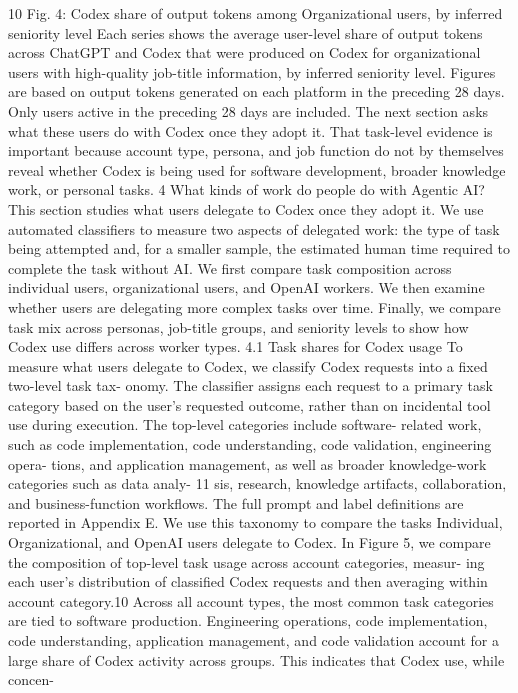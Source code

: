 10
Fig. 4: Codex share of output tokens among Organizational users, by inferred seniority level
Each series shows the average user-level share of output tokens across ChatGPT and Codex that were produced on Codex
for organizational users with high-quality job-title information, by inferred seniority level. Figures are based on output tokens
generated on each platform in the preceding 28 days. Only users active in the preceding 28 days are included.
The next section asks what these users do with Codex once they adopt it. That task-level evidence is
important because account type, persona, and job function do not by themselves reveal whether Codex
is being used for software development, broader knowledge work, or personal tasks.
4
What kinds of work do people do with Agentic AI?
This section studies what users delegate to Codex once they adopt it. We use automated classifiers to
measure two aspects of delegated work: the type of task being attempted and, for a smaller sample,
the estimated human time required to complete the task without AI. We first compare task composition
across individual users, organizational users, and OpenAI workers. We then examine whether users are
delegating more complex tasks over time. Finally, we compare task mix across personas, job-title groups,
and seniority levels to show how Codex use differs across worker types.
4.1
Task shares for Codex usage
To measure what users delegate to Codex, we classify Codex requests into a fixed two-level task tax-
onomy. The classifier assigns each request to a primary task category based on the user’s requested
outcome, rather than on incidental tool use during execution. The top-level categories include software-
related work, such as code implementation, code understanding, code validation, engineering opera-
tions, and application management, as well as broader knowledge-work categories such as data analy-
11
sis, research, knowledge artifacts, collaboration, and business-function workflows. The full prompt and
label definitions are reported in Appendix E. We use this taxonomy to compare the tasks Individual,
Organizational, and OpenAI users delegate to Codex.
In Figure 5, we compare the composition of top-level task usage across account categories, measur-
ing each user’s distribution of classified Codex requests and then averaging within account category.10
Across all account types, the most common task categories are tied to software production. Engineering
operations, code implementation, code understanding, application management, and code validation
account for a large share of Codex activity across groups. This indicates that Codex use, while concen-
